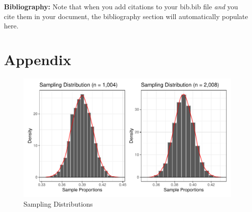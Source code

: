 \documentclass{article}\usepackage[]{graphicx}\usepackage[]{xcolor}
\makeatletter
\def\maxwidth{ %
  \ifdim\Gin@nat@width>\linewidth
    \linewidth
  \else
    \Gin@nat@width
  \fi
}
\newenvironment{knitrout}{}{} %
\makeatother
\begin{document}
\begin{multicols}{2}
\vspace{2em}

\noindent\textbf{Bibliography:} Note that when you add citations to your bib.bib file \emph{and}
you cite them in your document, the bibliography section will automatically populate here.

\begin{tiny}

\end{tiny}
\end{multicols}

\newpage
\onecolumn
\section{Appendix}


\begin{figure}[H]
\begin{center}
\begin{knitrout}
\color{fgcolor}

{\centering \includegraphics[width=\maxwidth]{figure/unnamed-chunk-4-1} 

}


\end{knitrout}
\caption{Sampling Distributions}
\label{plot1} 
\end{center}
\end{figure}
\end{document}
